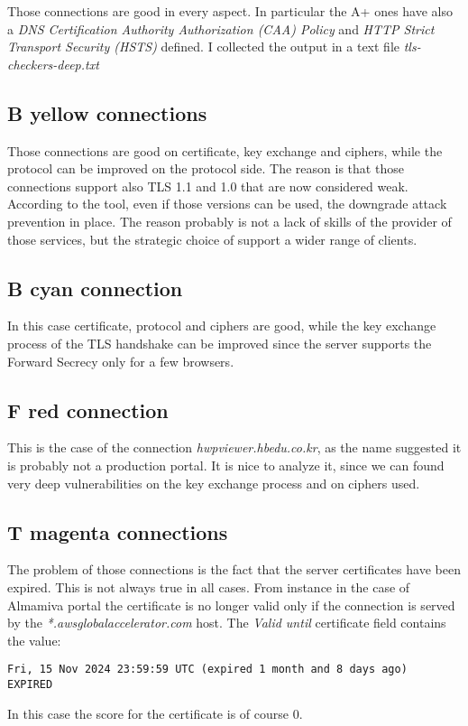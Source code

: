 \documentclass{article}
\begin{document}
Those connections are good in every aspect. In particular the A+ ones have also a \emph{DNS Certification Authority Authorization (CAA) Policy} and \emph{HTTP Strict Transport Security (HSTS)} defined.
I collected the output in a text file \emph{tls-checkers-deep.txt}

\subsection{B yellow connections}

Those connections are good on certificate, key exchange and ciphers, while  
the protocol can be improved on the protocol side.
The reason is that those connections support also TLS 1.1 and 1.0
that are now considered weak.
According to the tool, even if those versions can be used, the
downgrade attack prevention in place.
The reason probably is not a lack of skills of the provider of those
services, but the strategic choice of support a wider range
of clients.

\subsection{B cyan connection}

In this case certificate, protocol and ciphers are good, while the key exchange process
of the TLS handshake can be improved since the server supports the Forward Secrecy
only for a few browsers.

\subsection{F red connection}

This is the case of the connection \emph{hwpviewer.hbedu.co.kr},
as the name suggested it is probably not a production portal.
It is nice to analyze it, since we can found very deep vulnerabilities
on the key exchange process and on ciphers used.

\subsection{T magenta connections}

The problem of those connections is the fact that
the server certificates have been expired.
This is not always true in all cases.
From instance in the case of Almamiva portal
the certificate is no longer valid only if the
connection is served by the \emph{*.awsglobalaccelerator.com}
host. The \emph{Valid until} certificate field contains the value:

\begin{verbatim}
Fri, 15 Nov 2024 23:59:59 UTC (expired 1 month and 8 days ago)   
EXPIRED
\end{verbatim}

\noindent In this case the score for the certificate is of course 0.
\end{document}
